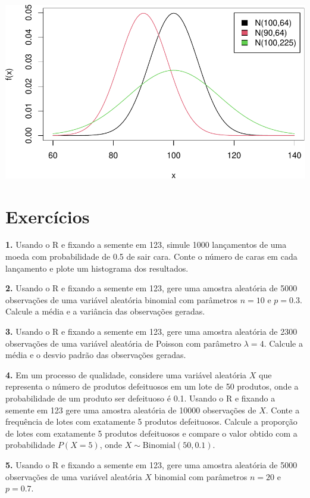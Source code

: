 \documentclass[
]{book}
\begin{document}
\includegraphics{introR_files/figure-latex/unnamed-chunk-284-1.pdf}

\section{Exercícios}\label{exercuxedcios-28}

\textbf{1.} Usando o R e fixando a semente em 123, simule 1000 lançamentos de
uma moeda com probabilidade de 0.5 de sair cara. Conte o número de caras
em cada lançamento e plote um histograma dos resultados.

\textbf{2.} Usando o R e fixando a semente em 123, gere uma amostra aleatória
de 5000 observações de uma variável aleatória binomial com parâmetros
\(n = 10\) e \(p = 0.3\). Calcule a média e a variância das observações
geradas.

\textbf{3.} Usando o R e fixando a semente em 123, gere uma amostra aleatória
de 2300 observações de uma variável aleatória de Poisson com parâmetro
\(\lambda = 4\). Calcule a média e o desvio padrão das observações
geradas.

\textbf{4.} Em um processo de qualidade, considere uma variável aleatória \(X\)
que representa o número de produtos defeituosos em um lote de 50
produtos, onde a probabilidade de um produto ser defeituoso é 0.1.
Usando o R e fixando a semente em 123 gere uma amostra aleatória de
10000 observações de \(X\). Conte a frequência de lotes com exatamente 5
produtos defeituosos. Calcule a proporção de lotes com exatamente 5
produtos defeituosos e compare o valor obtido com a probabilidade
\(P(X=5)\), onde \(X \sim \text{Binomial}(50, 0.1)\).

\textbf{5.} Usando o R e fixando a semente em 123, gere uma amostra aleatória
de 5000 observações de uma variável aleatória \(X\) binomial com
parâmetros \(n = 20\) e \(p = 0.7\).
\end{document}
